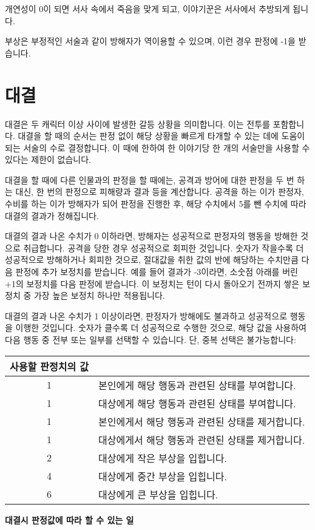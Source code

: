 \documentclass{report}
\begin{document}
	개연성이 0이 되면 서사 속에서 죽음을 맞게 되고, 이야기꾼은 서사에서 추방되게 됩니다.
	
	부상은 부정적인 서술과 같이 방해자가 역이용할 수 있으며, 이런 경우 판정에 -1을 받습니다.
	
	\section*{대결}
	대결은 두 캐릭터 이상 사이에 발생한 갈등 상황을 의미합니다. 이는 전투를 포함합니다. 대결을 할 때의 순서는 판정 없이 해당 상황을 빠르게 타개할 수 있는 데에 도움이 되는 서술의 수로 결정합니다. 이 때에 한하여 한 이야기당 한 개의 서술만을 사용할 수 있다는 제한이 없습니다.
	
	대결을 할 때에 다른 인물과의 판정을 할 때에는, 공격과 방어에 대한 판정을 두 번 하는 대신, 한 번의 판정으로 피해량과 결과 등을 계산합니다. 공격을 하는 이가 판정자, 수비를 하는 이가 방해자가 되어 판정을 진행한 후, 해당 수치에서 5를 뺀 수치에 따라 대결의 결과가 정해집니다.
	
	대결의 결과 나온 수치가 0 이하라면, 방해자는 성공적으로 판정자의 행동을 방해한 것으로 취급합니다. 공격을 당한 경우 성공적으로 회피한 것입니다. 숫자가 작을수록 더 성공적으로 방해하거나 회피한 것으로, 절대값을 취한 값의 반에 해당하는 수치만큼 다음 판정에 추가 보정치를 받습니다. 예를 들어 결과가 -3이라면, 소숫점 아래를 버린 +1의 보정치를 다음 판정에 받습니다. 이 보정치는 턴이 다시 돌아오기 전까지 쌓은 보정치 중 가장 높은 보정치 하나만 적용됩니다.
	
	대결의 결과 나온 수치가 1 이상이라면, 판정자가 방해에도 불과하고 성공적으로 행동을 이행한 것입니다. 숫자가 클수록 더 성공적으로 수행한 것으로, 해당 값을 사용하여 다음 행동 중 전부 또는 일부를 선택할 수 있습니다. 단, 중복 선택은 불가능합니다:
	
	\begin{minipage}{\textwidth}
		\begin{tabularx}{\textwidth}{c|X}
			\hline
			\textbf{사용할 판정치의 값} & \makecell{\centering\textbf{할 수 있는 일}} \\ \hline \hline
			1 & 본인에게 해당 행동과 관련된 상태를 부여합니다. \\ \hline
			1 & 대상에게 해당 행동과 관련된 상태를 부여합니다. \\ \hline
			1 & 본인에게서 해당 행동과 관련된 상태를 제거합니다. \\ \hline
			1 & 대상에게서 해당 행동과 관련된 상태를 제거합니다. \\ \hline
			2 & 대상에게 작은 부상을 입힙니다.\\ \hline
			4 & 대상에게 중간 부상을 입힙니다. \\ \hline
			6 & 대상에게 큰 부상을 입힙니다. \\ \hline
		\end{tabularx}
		
		\smallskip
		
		\begin{tightcenter}
			\textbf{대결시 판정값에 따라 할 수 있는 일}
		\end{tightcenter}
	\end{minipage}
	
\end{document}
